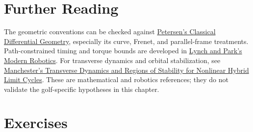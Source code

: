 \documentclass[12pt, openany]{book}
\theoremstyle{plain}
\begin{document}
\section{Further Reading}

The geometric conventions can be checked against
\href{https://www.math.ucla.edu/~petersen/DGnotes.pdf}{Petersen's Classical
Differential Geometry}, especially its curve, Frenet, and parallel-frame
treatments. Path-constrained timing and torque bounds are developed in
\href{https://modernrobotics.northwestern.edu/nu-gm-book-resource/9-4-time-optimal-time-scaling-part-1-of-3/}{Lynch and Park's Modern Robotics}.
For transverse dynamics and orbital stabilization, see
\href{https://arxiv.org/abs/1010.2241}{Manchester's Transverse Dynamics and
Regions of Stability for Nonlinear Hybrid Limit Cycles}. These are
mathematical and robotics references; they do not validate the golf-specific
hypotheses in this chapter.

\section{Exercises}
\end{document}
